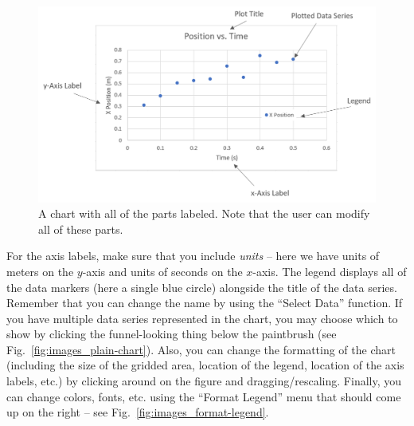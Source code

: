 \documentclass[10pt]{article}
\begin{document}
\begin{figure}[htpb]
	\centering
	\includegraphics[width=0.8\linewidth]{images/full-chart-labeled.png}
	\caption{
		A chart with all of the parts labeled. 
		Note that the user can modify all of these parts.}%
	\label{fig:images_full-chart-labeled}
\end{figure}

For the axis labels, make sure that you include \textit{units} -- here we have units of meters on the $y$-axis and units of seconds on the $x$-axis.
The legend displays all of the data markers (here a single blue circle) alongside the title of the data series.
Remember that you can change the name by using the ``Select Data'' function.
If you have multiple data series represented in the chart, you may choose which to show by clicking the funnel-looking thing below the paintbrush (see Fig.~\ref{fig:images_plain-chart}).
Also, you can change the formatting of the chart (including the size of the gridded area, location of the legend, location of the axis labels, etc.) by clicking around on the figure and dragging/rescaling.
Finally, you can change colors, fonts, etc. using the ``Format Legend'' menu that should come up on the right -- see Fig.~\ref{fig:images_format-legend}.
\end{document}
